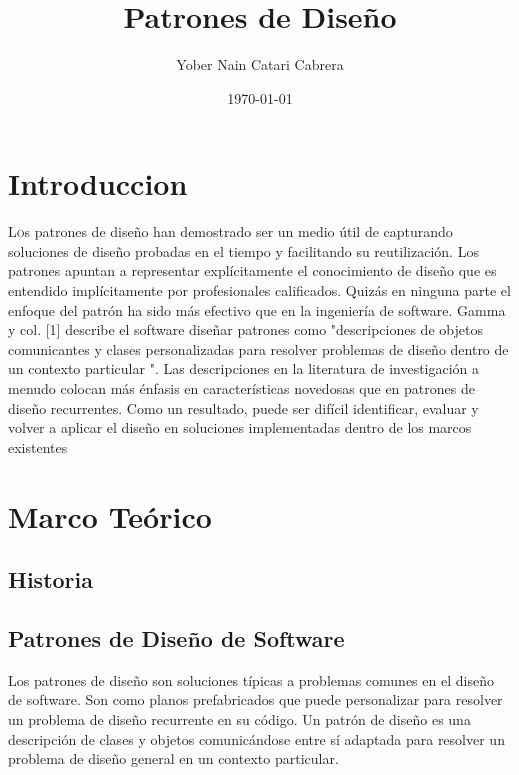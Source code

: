 \documentclass[twoside,twocolumn]{article}
\title{Patrones de Diseño} %
\author{Yober Nain Catari Cabrera}
\date{\today} %
\begin{document}
\maketitle


\section{Introduccion}

\lettrine[nindent=0em,lines=3]{L}os patrones de diseño han demostrado ser un medio útil de
capturando soluciones de diseño probadas en el tiempo y facilitando su reutilización.
Los patrones apuntan a representar explícitamente el conocimiento de diseño que es
entendido implícitamente por profesionales calificados.
Quizás en ninguna parte el enfoque del patrón ha sido más efectivo
que en la ingeniería de software. Gamma y col. [1] describe el software
diseñar patrones como "descripciones de objetos comunicantes y
clases personalizadas para resolver problemas de diseño dentro de un
contexto particular ".
Las descripciones en la literatura de investigación a menudo colocan más
énfasis en características novedosas que en patrones de diseño recurrentes. Como un
resultado, puede ser difícil identificar, evaluar y volver a aplicar el diseño
en soluciones implementadas dentro de los marcos existentes


\section {Marco Teórico}\label{sec:3}
\subsection{ Historia}
\subsection{ Patrones de Diseño de Software}
Los patrones de diseño son soluciones típicas a problemas comunes en el diseño de software. Son como planos prefabricados que puede personalizar para resolver un problema de diseño recurrente en su código.
Un patrón de diseño es una descripción de clases y objetos comunicándose entre sí adaptada para resolver un problema de diseño general en un contexto particular.\cite{Tanembaum3}
\end{document}
